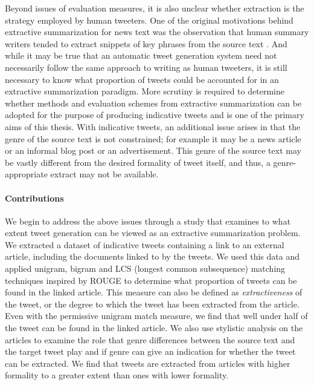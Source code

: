 Beyond issues of evaluation measures, it is also unclear whether extraction is the strategy employed by human tweeters. One of the original motivations behind extractive summarization for news text was the observation that human summary writers tended to extract snippets of key phrases from the source text \citep{mani-2001}.  And while it may be true that an automatic tweet generation system need not necessarily follow the same approach to writing as human tweeters, it is still necessary to know what proportion of tweets could be accounted for in an extractive summarization paradigm. More scrutiny is required to determine whether methods and evaluation schemes from extractive summarization can be adopted for the purpose of producing indicative tweets and is one of the primary aims of this thesis. With indicative tweets, an additional issue arises in that the genre of the source text is not constrained; for example it may be a news article or an informal blog post or an advertisement. This genre of the source text may be vastly different from the desired formality of tweet itself, and thus, a genre-appropriate extract may not be available. 


\paragraph{Contributions}
We begin to address the above issues through a study that examines to what extent tweet generation can be viewed as an extractive summarization problem. We extracted a dataset of indicative tweets containing a link to an external article, including the documents linked to by the tweets. We used this data and applied unigram, bigram and LCS (longest common subsequence) matching techniques inspired by ROUGE to determine what proportion of tweets can be found in the linked article.  This measure can also be defined as \emph{extractiveness} of the tweet, or the degree to which the tweet has been extracted from the article. Even with the permissive unigram match measure, we find that well under half of the tweet can be found in the linked article. We also use stylistic analysis on the articles to examine the role that genre differences between the source text and the target tweet play and if genre can give an indication for whether the tweet can be extracted. We find that tweets are extracted from articles with higher formality to a greater extent than ones with lower formality. 

